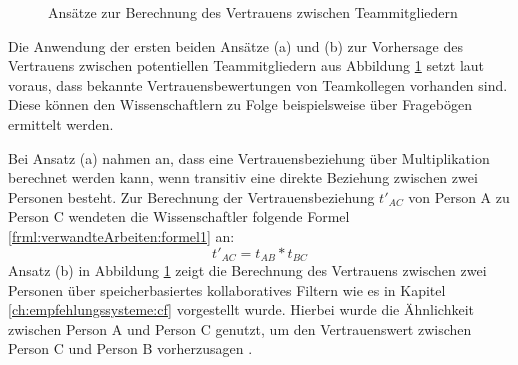 \begin{figure}[h]
	\centering
	
	
	\caption{Ansätze zur Berechnung des Vertrauens zwischen Teammitgliedern \cite[S. 5]{malinowski:2005}}
	\label{fig:verwandteArbeiten:abb2}
\end{figure}

Die Anwendung der ersten beiden Ansätze (a) und (b) zur Vorhersage des Vertrauens zwischen potentiellen Teammitgliedern aus Abbildung \ref{fig:verwandteArbeiten:abb2} setzt laut \textcite[S. 4ff.]{malinowski:2005} voraus, dass bekannte Vertrauensbewertungen von Teamkollegen vorhanden sind. Diese können den Wissenschaftlern zu Folge beispielsweise über Fragebögen ermittelt werden.

Bei Ansatz (a) nahmen \textcite[S. 5f.]{malinowski:2005} an, dass eine Vertrauensbeziehung über Multiplikation berechnet werden kann, wenn transitiv eine direkte Beziehung zwischen zwei Personen besteht. Zur Berechnung der Vertrauensbeziehung $t'_{AC}$ von Person A zu Person C wendeten die Wissenschaftler folgende Formel \ref{frml:verwandteArbeiten:formel1} an:
\begin{equation}
	t'_{AC} = t_{AB} * t_{BC}
	\label{frml:verwandteArbeiten:formel1}
\end{equation}
Ansatz (b) in Abbildung \ref{fig:verwandteArbeiten:abb2} zeigt die Berechnung des Vertrauens zwischen zwei Personen über speicherbasiertes kollaboratives Filtern wie es in Kapitel \ref{ch:empfehlungssysteme:cf} vorgestellt wurde. Hierbei wurde die Ähnlichkeit zwischen Person A und Person C genutzt, um den Vertrauenswert zwischen Person C und Person B vorherzusagen \cite[S. 6]{malinowski:2005}.

